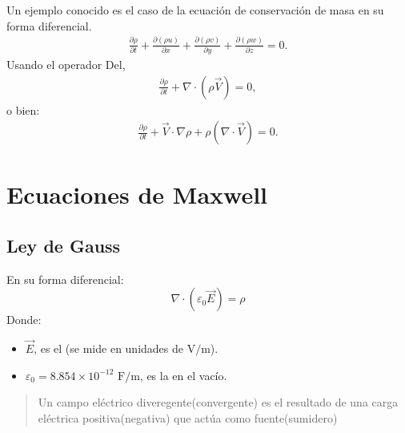 \documentclass[letterpaper,10pt,english]{jupyterBook}
\begin{document}
\sphinxAtStartPar
Un ejemplo conocido es el caso de la ecuación de conservación de masa en su forma diferencial.
\begin{equation*}
\begin{split}\frac{\partial \rho}{\partial t}+\frac{\partial (\rho u)}{\partial x} +\frac{\partial (\rho v)}{\partial y}+\frac{\partial (\rho w)}{\partial z}=0.\end{split}
\end{equation*}
\sphinxAtStartPar
Usando el operador Del,
\begin{equation*}
\begin{split}\frac{\partial \rho}{\partial t} + \nabla\cdot\left(\rho\vec{V}\right)
=0,\end{split}
\end{equation*}
\sphinxAtStartPar
o bien:
\begin{equation*}
\begin{split}\frac{\partial \rho}{\partial t} + \vec{V}\cdot\nabla\rho+ \rho\left(\nabla\cdot\vec{V}\right)
=0.\end{split}
\end{equation*}

\section{Ecuaciones de Maxwell}
\label{\detokenize{1_ondas_electromagneticas/1_ondas_electromagneticas:ecuaciones-de-maxwell}}

\subsection{Ley de Gauss}
\label{\detokenize{1_ondas_electromagneticas/1_ondas_electromagneticas:ley-de-gauss}}
\sphinxAtStartPar
{}

\sphinxAtStartPar
En su forma diferencial:
\label{equation:1_ondas_electromagneticas/1_ondas_electromagneticas:ffa31127-4d5c-48ff-9fa8-10c025ef116b}\begin{equation}
\nabla\cdot\left(\varepsilon_0\vec{E}\right) = \rho
\end{equation}
\sphinxAtStartPar
Donde:
\begin{itemize}
\item {} 
\sphinxAtStartPar
\(\vec{E}\), es el  (se mide en unidades de \(\mathrm{V/m}\)).

\item {} 
\sphinxAtStartPar
\(\varepsilon_0 = 8.854\times10^{-12}\) \(\mathrm{F/m}\), es la  en el vacío.

\end{itemize}
\begin{quote}

\sphinxAtStartPar
Un campo eléctrico diveregente(convergente) es el resultado de una carga eléctrica positiva(negativa) que actúa como fuente(sumidero)
\end{quote}
\end{document}
